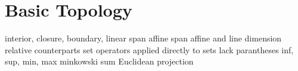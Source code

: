 \chapter{Basic Topology}
\label{chap:basic_topology}

interior, closure, boundary,
linear span 
affine span
affine and line dimension 
relative counterparts
set operators applied directly to sets lack parantheses 
inf, sup, min, max
minkowski sum
Euclidean projection